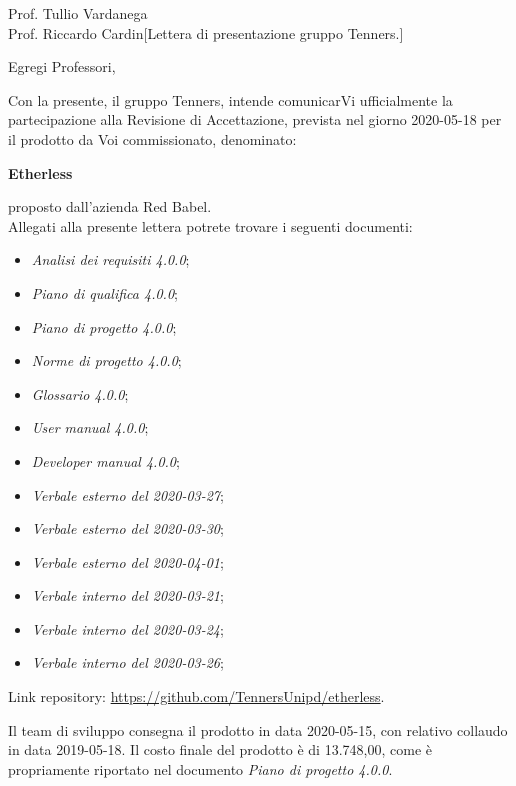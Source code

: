 \begin{letter}{Prof. Tullio Vardanega \\Prof. Riccardo Cardin}[Lettera di presentazione gruppo Tenners.]
\opening[Padova, ]{Egregi Professori,}
	Con la presente, il gruppo Tenners, intende comunicarVi ufficialmente la partecipazione alla Revisione di Accettazione, prevista nel giorno 2020-05-18 per il prodotto da Voi commissionato, denominato:
	\begin{center}
		\textbf{Etherless}
	\end{center}
    proposto dall'azienda Red Babel.\\
    \noindent Allegati alla presente lettera potrete trovare i seguenti documenti:
    \begin{itemize}
    	\item \textit{Analisi dei requisiti 4.0.0}\docs;
    	\item \textit{Piano di qualifica 4.0.0}\docs;
    	\item \textit{Piano di progetto 4.0.0}\docs;
    	\item \textit{Norme di progetto 4.0.0}\docs;
    	\item \textit{Glossario 4.0.0}\docs;
    	\item \textit{User manual 4.0.0}\docs;
    	\item \textit{Developer manual 4.0.0}\docs;
    	\item \textit{Verbale esterno del 2020-03-27}\docs;
    	\item \textit{Verbale esterno del 2020-03-30}\docs;
    	\item \textit{Verbale esterno del 2020-04-01}\docs;
    	\item \textit{Verbale interno del 2020-03-21}\docs;
    	\item \textit{Verbale interno del 2020-03-24}\docs;
    	\item \textit{Verbale interno del 2020-03-26}\docs;
    \end{itemize}
	Link repository: \url{https://github.com/TennersUnipd/etherless}.
	
	\noindent Il team di sviluppo consegna il prodotto in data 2020-05-15, con relativo collaudo in data 2019-05-18. Il costo finale del prodotto è di 13.748,00\officialeuro, come è propriamente riportato nel documento \textit{Piano di progetto 4.0.0}.
	

\end{letter}
